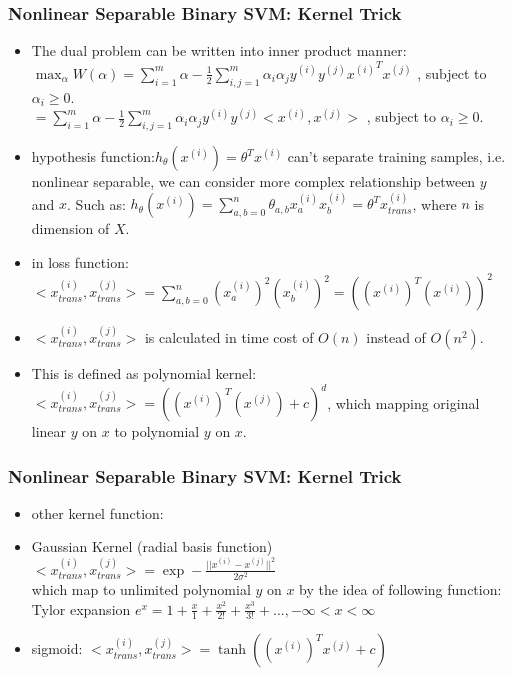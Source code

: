 \begin{frame}
\frametitle{Nonlinear Separable Binary SVM: Kernel Trick}
	\small
	\begin{itemize}
		\item The dual problem can be written into inner product manner:\\
		 	$\max_{\alpha}W(\alpha)
					=\sum_{i=1}^{m}\alpha
					-\frac{1}{2}\sum_{i,j=1}^{m}\alpha_i\alpha_jy^{(i)}y^{(j)}{x^{(i)}}^Tx^{(j)}$
					, subject to $\alpha_i \geq 0$.\\
					$=\sum_{i=1}^{m}\alpha
					 -\frac{1}{2}\sum_{i,j=1}^{m}\alpha_i\alpha_jy^{(i)}y^{(j)}<x^{(i)},x^{(j)}>$
					, subject to $\alpha_i \geq 0$.\\
		\item hypothesis function:$h_{\theta}(x^{(i)})=\theta^Tx^{(i)}$ can't separate training samples, i.e. nonlinear separable, we can consider more complex relationship between $y$ and $x$. Such as:
				$h_{\theta}(x^{(i)})=\sum_{a,b=0}^n\theta_{a,b}x^{(i)}_ax^{(i)}_b=\theta^Tx_{trans}^{(i)}$,
				where $n$ is dimension of $X$. 
		\item in loss function: $<x_{trans}^{(i)},x_{trans}^{(j)}>=\sum_{a,b=0}^n(x^{(i)}_a)^2(x^{(i)}_b)^2=((x^{(i)})^T(x^{(i)}))^2$
		\item $<x_{trans}^{(i)},x_{trans}^{(j)}>$ is calculated in time cost of $O(n)$ instead of $O(n^2)$.
		\item This is defined as polynomial kernel: $<x_{trans}^{(i)},x_{trans}^{(j)}>=((x^{(i)})^T(x^{(j)})+c)^d$, which mapping original linear $y$ on $x$ to polynomial $y$ on $x$.

	\end{itemize}
\end{frame}
\begin{frame}
\frametitle{Nonlinear Separable Binary SVM: Kernel Trick}
	\small
	\begin{itemize}
		\item other kernel function:
		\item Gaussian Kernel (radial basis function)
			\\$<x_{trans}^{(i)},x_{trans}^{(j)}>=\exp -\frac{||x^{(i)}-x^{(j)}||^2}{2\sigma^2}$
			\\which map to unlimited polynomial $y$ on $x$ by the idea of following function:
			\\Tylor expansion $e^x=1+\frac{x}{1}+\frac{x^2}{2!}+\frac{x^3}{3!}+...,-\infty<x<\infty$
		\item sigmoid: $<x_{trans}^{(i)},x_{trans}^{(j)}>=\tanh ((x^{(i)})^Tx^{(j)}+c)$
	\end{itemize}
\end{frame}
